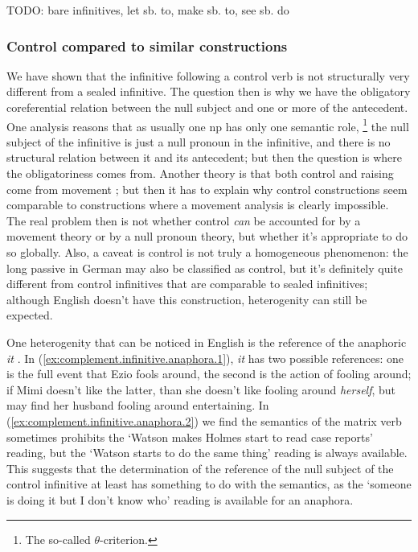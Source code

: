 \documentclass[UTF8, a4paper, oneside, scheme=plain, 12pt]{ctexbook}
\newcommand*{\citepage}[1]{p.~{#1}}
\newcommand{\form}[1]{\emph{#1}}
\newcommand{\translate}[1]{`#1'}
\begin{document}
TODO: bare infinitives, let sb. to, make sb. to, see sb. do \citet[\citepage{1236},\citepage{1254}]{cgel}

\subsubsection{Control compared to similar constructions}\label{sec:complement.infinitive.control}

We have shown that the infinitive following a control verb 
is not structurally very different from a sealed infinitive. 
The question then is why we have the obligatory coreferential relation 
between the null subject and one or more of the antecedent.
One analysis reasons that as usually one \acs{np} has only one semantic role,%
\footnote{
    The so-called $\theta$-criterion.
} 
the null subject of the infinitive is just a null pronoun in the infinitive, 
and there is no structural relation between it and its antecedent; 
but then the question is where the obligatoriness comes from.
Another theory is that both control and raising come from movement
\citep{hornstein1999movement}; 
but then it has to explain why control constructions seem comparable to  
constructions where a movement analysis is clearly impossible.
The real problem then is not whether control \emph{can} be accounted for 
by a movement theory or by a null pronoun theory, 
but whether it's appropriate to do so globally.
Also, a caveat is control is not truly a homogeneous phenomenon: 
the long passive in German may also be classified as control, 
but it's definitely quite different from control infinitives 
that are comparable to sealed infinitives; 
although English doesn't have this construction, 
heterogenity can still be expected.

One heterogenity that can be noticed in English is the reference of the anaphoric \form{it}
\citep{wurmbrand2002syntactic}.
In (\ref{ex:complement.infinitive.anaphora.1}), 
\form{it} has two possible references: 
one is the full event that Ezio fools around, 
the second is the action of fooling around; 
if Mimi doesn't like the latter, than she doesn't like fooling around \emph{herself},
but may find her husband fooling around entertaining.
In (\ref{ex:complement.infinitive.anaphora.2}) 
we find the semantics of the matrix verb sometimes prohibits
the \translate{Watson makes Holmes start to read case reports} reading, 
but the \translate{Watson starts to do the same thing} reading is always available.
This suggests that the determination of the reference of the null subject of the control infinitive 
at least has something to do with the semantics, 
as the \translate{someone is doing it but I don't know who} reading 
is available for an anaphora.
\end{document}
